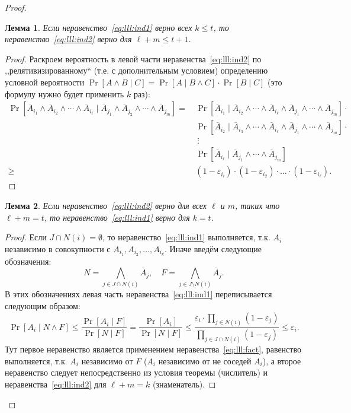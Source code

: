 \documentclass[12pt]{article}
\newcommand{\seqin}[3]{{#1}_{{#2}_1},{#1}_{{#2}_2},\dotsc,{#1}_{{#2}_{#3}}}
\theoremstyle{definition}
\theoremstyle{plain}
\newtheorem{lemma}{Лемма}[section]
\theoremstyle{remark}
\begin{document}
\begin{proof}
    \begin{lemma}\label{lm:lll:l1}
    Если неравенство~\eqref{eq:lll:ind1} верно всех $k \le t$, то неравенство~\eqref{eq:lll:ind2} верно для $\ell + m \le t + 1$. 
    \end{lemma}
    \begin{proof}
    Раскроем вероятность в левой части неравенства~\eqref{eq:lll:ind2} 
    по ,,релятивизированному`` (т.е. с дополнительным условием)
    определению условной вероятности $\Pr[A \land B\mid C] = \Pr[A \mid B \land C]\cdot \Pr[B\mid C]$
    (это формулу нужно будет применить $k$ раз):
    \[
        \begin{aligned}
        \Pr[\overline A_{i_1}\land \overline A_{i_2} \land\dotsb\land \overline A_{i_\ell} \mid 
            \overline A_{j_1}\land \overline A_{j_2} \land\dotsb\land \overline A_{j_m} ] =\,
        &\Pr[\overline A_{i_1} \mid \overline A_{i_2}\land\dotsb\land \overline A_{i_\ell}\land 
            \overline A_{j_1}\land \dotsb\land \overline A_{j_m} ] \cdot\\
        &\Pr[\overline A_{i_2} \mid \overline A_{i_3}\land\dotsb\land \overline A_{i_\ell}\land 
            \overline A_{j_1}\land \dotsb\land \overline A_{j_m} ]\cdot\\
        &\ \vdots\\
        &\Pr[\overline A_{i_\ell} \mid 
            \overline A_{j_1}\land \dotsb\land \overline A_{j_m} ]\\
        \ge\,&(1-\varepsilon_{i_i})\cdot(1-\varepsilon_{i_2})\cdot\dotso\cdot(1-\varepsilon_{i_\ell}).
        \end{aligned}
    \]
    \end{proof}


    \begin{lemma}\label{lm:lll:l2}
    Если неравенство~\eqref{eq:lll:ind2} верно для всех $\ell$ и $m$, таких что $\ell + m = t$, 
    то неравенство~\eqref{eq:lll:ind1} верно для $k = t$.
    \end{lemma}
    \begin{proof}
    Если $J\cap N(i) = \emptyset$, то неравенство~\eqref{eq:lll:ind1} выполняется, т.к. 
    $A_i$ независимо в совокупности с $\seqin{A}{i}{k}$. Иначе введём следующие обозначения:
    \[N = \bigwedge_{j\in J\cap N(i)} \overline A_j,\quad
      F = \bigwedge_{j\in J\setminus N(i)} \overline A_j.
    \]
    В этих обозначениях левая часть неравенства~\eqref{eq:lll:ind1} переписывается следующим образом:
    \[
    \Pr[A_i\mid N\land F ] 
        \le \frac{\Pr [A_i\mid F]}{\Pr[N\mid F]} 
        =   \frac{\Pr [A_i]}{\Pr[N\mid F]} 
        \le \frac{\varepsilon_i \cdot \prod_{j\in N(i)} (1-\varepsilon_j)}
                                     {\prod_{j\in J \cap N(i)} (1-\varepsilon_j)} \le \varepsilon_i.
    \]
    Тут первое неравенство является применением неравенства~\eqref{eq:lll:fact}, равенство выполняется,
    т.к. $A_i$ независимо от $F$ ($A_i$ независимо от не соседей $A_i$), а второе неравенство
    следует непосредственно из условия теоремы (числитель) и неравенства~\eqref{eq:lll:ind2} для $\ell + m = k$ (знаменатель).
    \end{proof}
    

\end{proof}
\end{document}

